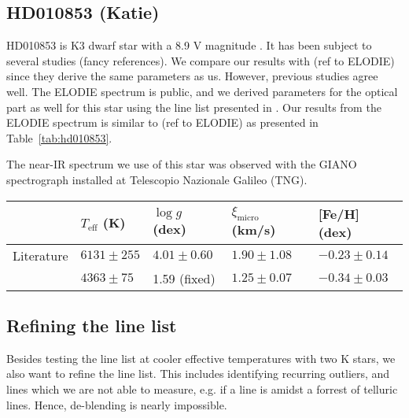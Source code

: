 \documentclass{aa}
\begin{document}
\subsection{HD010853 (Katie)}
\label{sub:HD010853}
HD010853 is K3 dwarf star with a 8.9 V magnitude \citep{Koen2010}. It has
been subject to several studies (fancy references). We compare our results
with (ref to ELODIE) since they derive the same parameters as us. However,
previous studies agree well. The ELODIE spectrum is public, and we derived
parameters for the optical part as well for this star using the line list
presented in \citet{Sousa2008a}. Our results from the ELODIE spectrum is
similar to (ref to ELODIE) as presented in Table~\ref{tab:hd010853}.

The near-IR spectrum we use of this star was observed with the GIANO
spectrograph installed at Telescopio Nazionale Galileo (TNG).




\begin{table*}[htb!]
    \caption{The derived parameters for HD010853 with
    fixed surface gravity cut after 3$\sigma$ outlier removal. linelist: arcturus2Cut4ol.moog}
    \label{tab:hd010853}
    \centering
    \begin{tabular}{lllll}
      \hline\hline
                     & $T_\mathrm{eff}$ (K) &  $\log g$ (dex)  &   $\xi_\mathrm{micro}$ (km/s)  & [Fe/H] (dex)      \\
      \hline
        Literature   & $6131 \pm 255$       &  $4.01 \pm 0.60$ &    $1.90 \pm 1.08$              & $-0.23 \pm 0.14$ \\
      \hline
                     & $4363 \pm 75$        &   1.59 (fixed)   &    $1.25 \pm 0.07$              & $-0.34 \pm 0.03$ \\
      \hline
    \end{tabular}
\end{table*}




\subsection{Refining the line list}
\label{sub:refining_the_line_list}
Besides testing the line list at cooler effective temperatures
with two K stars, we also want to refine the line list. This
includes identifying recurring outliers, and lines which we are
not able to measure, e.g. if a line is amidst a forrest of
telluric lines. Hence, de-blending is nearly impossible.
\end{document}

